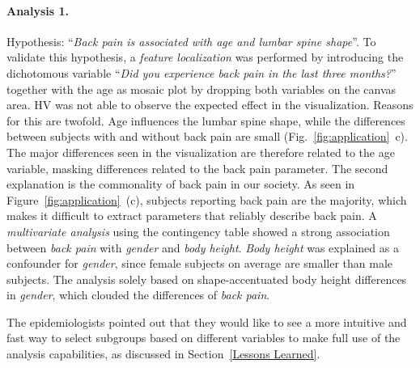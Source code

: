 \documentclass[journal]{style/vgtc} 			          %
\begin{document}
\paragraph{Analysis 1.}
Hypothesis: ``\emph{Back pain is associated with age and lumbar spine shape}''.
%
To validate this hypothesis, a \emph{feature localization} was performed by introducing the dichotomous variable ``\emph{Did you experience back pain in the last three months?}'' together with the age as mosaic plot by dropping both variables on the canvas area.
%
HV was not able to observe the expected effect in the visualization.
%
Reasons for this are twofold.
%
Age influences the lumbar spine shape, while the differences between subjects with and without back pain are small (Fig.~\ref{fig:application}~c).
%
The major differences seen in the visualization are therefore related to the age variable, masking differences related to the back pain parameter.
%
The second explanation is the commonality of back pain in our society.
%
As seen in Figure~\ref{fig:application}~(c), subjects reporting back pain are the majority, which makes it difficult to extract parameters that reliably describe back pain.
%
A \emph{multivariate analysis} using the contingency table showed a strong association between \emph{back pain} with \emph{gender} and \emph{body height}.
%
\emph{Body height} was explained as a confounder for \emph{gender}, since female subjects on average are smaller than male subjects.
%
The analysis solely based on shape-accentuated body height differences in \emph{gender}, which clouded the differences of \emph{back pain}.
%

The epidemiologists pointed out that they would like to see a more intuitive and fast way to select subgroups based on different variables to make full use of the analysis capabilities, as discussed in Section~\ref{Lessons Learned}.
\end{document}
